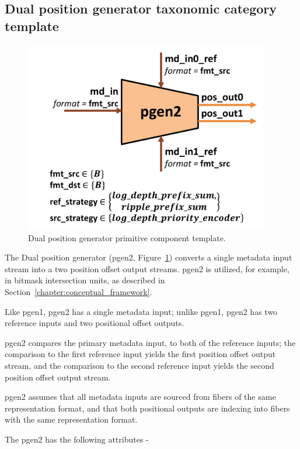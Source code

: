 \subsection{Dual position generator taxonomic category template}

\begin{figure}[H]
    \centering
    \includegraphics[width=0.95\textwidth]{figures/pgen2.pdf}
    \caption{Dual position generator primitive component template.}
    \label{fig:pgen2}
\end{figure}

The Dual position generator (pgen2, Figure~\ref{fig:pgen2}) converts a single metadata input stream into a two position offset output streams. pgen2 is utilized, for example, in bitmask intersection units, as described in Section~\ref{chapter:conceptual_framework}.

Like pgen1, pgen2 has a single metadata input; unlike pgen1, pgen2 has two reference inputs and two positional offset outputs. 

pgen2 compares the primary metadata input, to both of the reference inputs; the comparison to the first reference input yields the first position offset output stream, and the comparison to the second reference input yields the second position offset output stream.

pgen2 assumes that all metadata inputs are sourced from fibers of the same representation format, and that both positional outputs are indexing into fibers with the same representation format.

The pgen2 has the following attributes -

